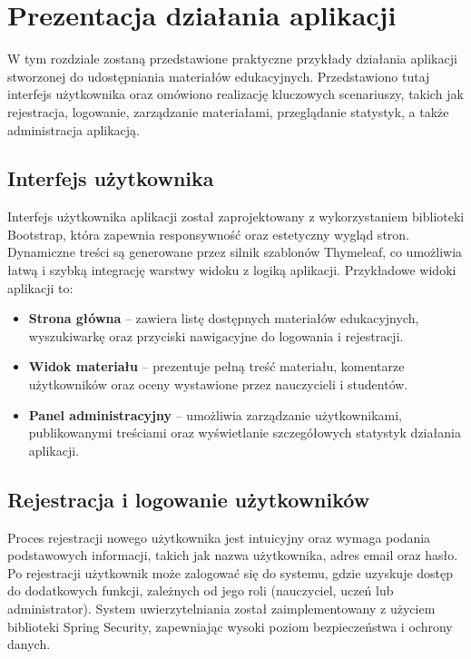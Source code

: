 \chapter{Prezentacja działania aplikacji}

W tym rozdziale zostaną przedstawione praktyczne przykłady działania aplikacji stworzonej do udostępniania materiałów edukacyjnych. Przedstawiono tutaj interfejs użytkownika oraz omówiono realizację kluczowych scenariuszy, takich jak rejestracja, logowanie, zarządzanie materiałami, przeglądanie statystyk, a także administracja aplikacją.

\section{Interfejs użytkownika}

Interfejs użytkownika aplikacji został zaprojektowany z wykorzystaniem biblioteki Bootstrap, która zapewnia responsywność oraz estetyczny wygląd stron. Dynamiczne treści są generowane przez silnik szablonów Thymeleaf, co umożliwia łatwą i szybką integrację warstwy widoku z logiką aplikacji. Przykładowe widoki aplikacji to:

\begin{itemize}
    \item \textbf{Strona główna} – zawiera listę dostępnych materiałów edukacyjnych, wyszukiwarkę oraz przyciski nawigacyjne do logowania i rejestracji.
    \item \textbf{Widok materiału} – prezentuje pełną treść materiału, komentarze użytkowników oraz oceny wystawione przez nauczycieli i studentów.
    \item \textbf{Panel administracyjny} – umożliwia zarządzanie użytkownikami, publikowanymi treściami oraz wyświetlanie szczegółowych statystyk działania aplikacji.
\end{itemize}

\section{Rejestracja i logowanie użytkowników}

Proces rejestracji nowego użytkownika jest intuicyjny oraz wymaga podania podstawowych informacji, takich jak nazwa użytkownika, adres email oraz hasło. Po rejestracji użytkownik może zalogować się do systemu, gdzie uzyskuje dostęp do dodatkowych funkcji, zależnych od jego roli (nauczyciel, uczeń lub administrator). System uwierzytelniania został zaimplementowany z użyciem biblioteki Spring Security, zapewniając wysoki poziom bezpieczeństwa i ochrony danych.

